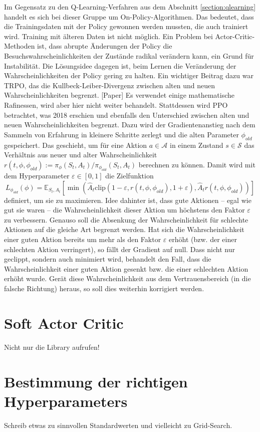 Im Gegensatz zu den Q-Learning-Verfahren aus dem Abschnitt \ref{section:qlearning} handelt es sich bei dieser Gruppe um On-Policy-Algorithmen.
Das bedeutet, dass die Trainingsdaten mit der Policy gewonnen werden mussten, die auch trainiert wird.
Training mit älteren Daten ist nicht möglich.
Ein Problem bei Actor-Critic-Methoden ist, dass abrupte Änderungen der Policy die Besuchswahrscheinlichkeiten der Zustände radikal verändern kann, ein Grund für Instabilität.
Die Lösungsidee dagegen ist, beim Lernen die Veränderung der Wahrscheinlichkeiten der Policy gering zu halten.
Ein wichtiger Beitrag dazu war TRPO, das die Kullbeck-Leiber-Divergenz zwischen alten und neuen Wahrscheinlichkeiten begrenzt. [Paper]
Es verwendet einige mathematische Rafinessen, wird aber hier nicht weiter behandelt.
Stattdessen wird PPO betrachtet, was 2018 erschien und ebenfalls den Unterschied zwischen alten und neuen Wahrscheinlichkeiten begrenzt.
Dazu wird der Gradientenanstieg nach dem Sammeln von Erfahrung in kleinere Schritte zerlegt und die alten Parameter $\phi_{old}$ gespeichert.
Das geschieht, um für eine Aktion $a \in \mathcal{A}$ in einem Zustand $s \in \mathcal{S}$ das Verhältnis aus neuer und alter Wahrscheinlichkeit $r(t, \phi, \phi_{old}) := \pi_\phi(S_t, A_t) / \pi_{\phi_{old}}(S_t, A_t)$ berechnen zu können.
Damit wird mit dem Hyperparameter $\varepsilon \in [0,1]$ die Zielfunktion
\begin{equation}
    L_\phi_{old}(\phi) = \mathbb{E}_{S_t, A_t}\left[\min{\left(\hat{A}_t \text{clip}{\left(1 - \varepsilon, r(t, \phi, \phi_{old}), 1 + \varepsilon\right)}, \hat{A}_t r(t, \phi, \phi_{old})\right)}\right]
\end{equation}
definiert, um sie zu maximieren.
Idee dahinter ist, dass gute Aktionen -- egal wie gut sie waren -- die Wahrscheinlichkeit dieser Aktion um höchstens den Faktor $\varepsilon$ zu verbessern.
Genauso soll die Absenkung der Wahrscheinlichkeit für schlechte Aktionen auf die gleiche Art begrenzt werden.
Hat sich die Wahrscheinlichkeit einer guten Aktion bereits um mehr als den Faktor $\varepsilon$ erhöht (bzw. der einer schlechten Aktion verringert), so fällt der Gradient auf null.
Dass nicht nur geclippt, sondern auch minimiert wird, behandelt den Fall, dass die Wahrscheinlichkeit einer guten Aktion gesenkt bzw. die einer schlechten Aktion erhöht wurde.
Gerät diese Wahrscheinlichkeit aus dem Vertrauensbereich (in die falsche Richtung) heraus, so soll dies weiterhin korrigiert werden.

\section{Soft Actor Critic}
Nicht nur die Library aufrufen!

\section{Bestimmung der richtigen Hyperparameters}
Schreib etwas zu sinnvollen Standardwerten und vielleicht zu Grid-Search.
